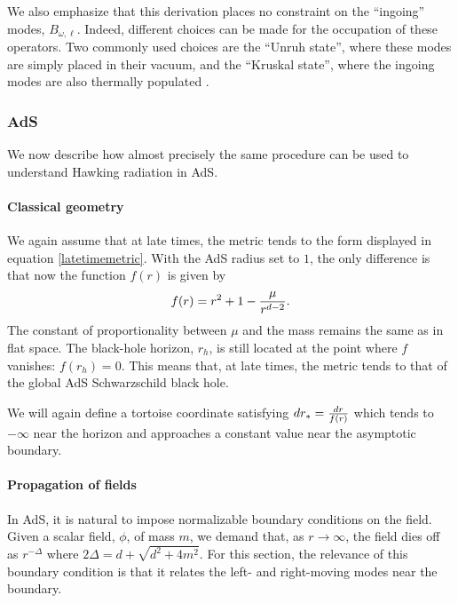 \documentclass[12pt]{article}
\def\rtor{{r_*}}
\newcommand{\be}{\begin{equation}}
\newcommand{\ee}{\end{equation}}
\begin{document}
We also emphasize that this derivation places no constraint on the ``ingoing'' modes, $B_{\omega, \ell}$.  Indeed, different choices can be made for the occupation of these operators. Two commonly used choices are the ``Unruh state'', where these modes are simply placed in their vacuum, and the ``Kruskal state'', where the ingoing modes are also thermally populated \cite{Candelas:1980zt}.



\subsubsection{AdS \label{adshawkingderiv}}
We now describe how almost precisely the same procedure can be used to understand Hawking radiation in AdS.

\paragraph{\bf Classical geometry \\}
We again assume that at late times, the metric tends to the form displayed in equation \eqref{latetimemetric}. With the AdS radius set to $1$, the only difference is that now the function $f(r)$ is given by
\be
\label{fadsexplicit}
f(r) = r^2 + 1 - {\mu \over r^{d-2}}.
\ee
The constant of proportionality between $\mu$ and the mass remains the same as in flat space. The black-hole horizon, $r_h$, is still located at the point where $f$ vanishes: $f(r_h) = 0$.  This means that, at late times, the metric tends to that of the global AdS Schwarzschild black hole.

We will again define a tortoise coordinate satisfying $d \rtor = {d r \over f(r)}$ which tends to $-\infty$ near the horizon and approaches a constant value near the asymptotic boundary.

\paragraph{\bf Propagation of fields \\}
In AdS, it is natural to impose normalizable boundary conditions on the field. Given a scalar field, $\phi$, of mass $m$, we demand that, as $r \rightarrow \infty$, the field dies off as $r^{-\Delta}$ where $2 \Delta = d + \sqrt{d^2 + 4 m^2}$. For this section, the relevance of this boundary condition is that it relates the left- and right-moving modes near the boundary.
\end{document}
